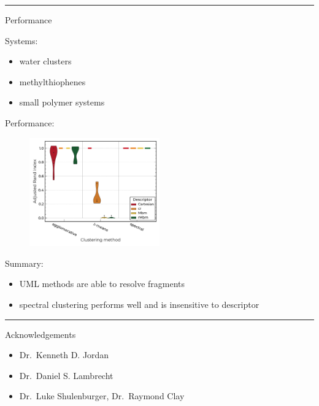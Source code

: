 \documentclass[
  letterpaper,
  DIV=11,
  numbers=noendperiod]{scrartcl}
\providecommand{\tightlist}{%
  \setlength{\itemsep}{0pt}\setlength{\parskip}{0pt}}\usepackage{longtable,booktabs,array}
\begin{document}
\begin{center}\rule{0.5\linewidth}{0.5pt}\end{center}

Performance

Systems:

\begin{itemize}
\tightlist
\item
  water clusters
\item
  methylthiophenes
\item
  small polymer systems
\end{itemize}

Performance:

\begin{figure}

\includegraphics[width=0.5\textwidth,height=\textheight]{images/mt_wb97x-d_violin_randidx.png} \hfill{}

\end{figure}

Summary:

\begin{itemize}
\tightlist
\item
  UML methods are able to resolve fragments
\item
  spectral clustering performs well and is insensitive to descriptor
\end{itemize}

\begin{center}\rule{0.5\linewidth}{0.5pt}\end{center}

Acknowledgements

\begin{itemize}
\tightlist
\item
  Dr.~Kenneth D. Jordan
\item
  Dr.~Daniel S. Lambrecht
\item
  Dr.~Luke Shulenburger, Dr.~Raymond Clay
\end{itemize}
\end{document}
